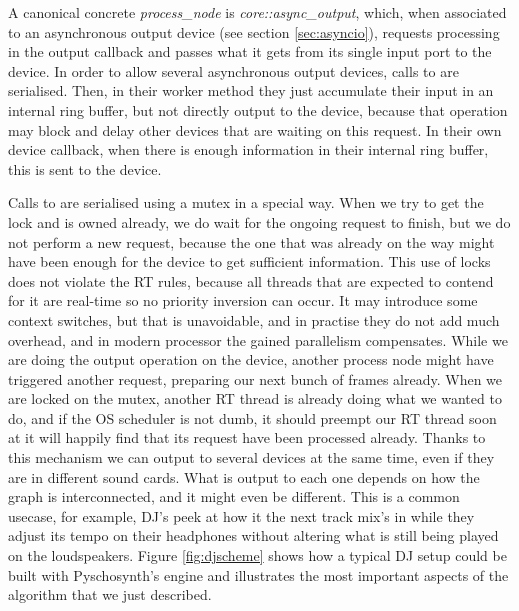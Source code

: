 A canonical concrete \emph{process\_node} is
\emph{core::async\_output}, which, when associated to an asynchronous
output device (see section \ref{sec:asyncio}), requests processing in
the output callback and passes what it gets from its single input port
to the device. In order to allow several asynchronous output devices,
calls to  are serialised. Then, in their
worker method they just accumulate their input in an internal ring
buffer, but not directly output to the device, because that operation
may block and delay other devices that are waiting on this request. In
their own device callback, when there is enough information in their
internal ring buffer, this is sent to the device.

Calls to  are serialised using a mutex in a
special way. When we try to get the lock and is owned already, we do
wait for the ongoing request to finish, but we do not perform a new
request, because the one that was already on the way might have been
enough for the device to get sufficient information. This use of locks
does not violate the RT rules, because all threads that are expected
to contend for it are real-time so no priority inversion can occur. It
may introduce some context switches, but that is unavoidable, and in
practise they do not add much overhead, and in modern processor the
gained parallelism compensates. While we are doing the output
operation on the device, another process node might have triggered
another request, preparing our next bunch of frames already. When we
are locked on the mutex, another RT thread is already doing what we
wanted to do, and if the OS scheduler is not dumb, it should preempt
our RT thread soon at it will happily find that its request have been
processed already. Thanks to this mechanism we can output to several
devices at the same time, even if they are in different sound
cards. What is output to each one depends on how the graph is
interconnected, and it might even be different. This is a common
usecase, for example, DJ's peek at how it the next track mix's in
while they adjust its tempo on their headphones without altering what
is still being played on the loudspeakers. Figure \ref{fig:djscheme}
shows how a typical DJ setup could be built with Pyschosynth's engine
and illustrates the most important aspects of the algorithm that we
just described.

